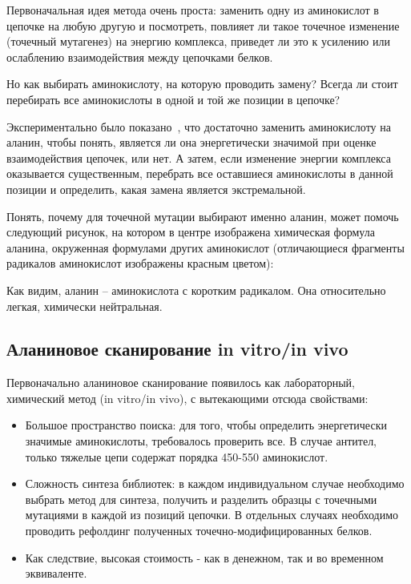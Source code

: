 Первоначальная идея метода очень проста: заменить одну из аминокислот в цепочке на любую другую и посмотреть, повлияет ли такое точечное изменение (точечный мутагенез) на энергию комплекса, приведет ли это к усилению или ослаблению взаимодействия между цепочками белков. 

Но как выбирать аминокислоту, на которую проводить замену? Всегда ли стоит перебирать все аминокислоты в одной и той же позиции в цепочке?

Экспериментально было показано~\cite{alascan2001}, что достаточно заменить аминокислоту на аланин, чтобы понять, является ли она энергетически значимой при оценке взаимодействия цепочек, или нет. А затем, если изменение энергии комплекса \ddG\,  оказывается существенным, перебрать все оставшиеся аминокислоты в данной позиции и определить, какая замена является экстремальной.

Понять, почему для точечной мутации выбирают именно аланин, может помочь следующий рисунок, на котором в центре изображена химическая формула аланина, окруженная формулами других аминокислот (отличающиеся фрагменты радикалов аминокислот изображены красным цветом):

\begin{center}
 \resizebox{0.4\textheight}{!}{
 \ttfamily
 \footnotesize
 \aapicture
 }
\end{center}

Как видим, аланин -- аминокислота с коротким радикалом. Она относительно легкая, химически нейтральная. 

\subsection{Аланиновое сканирование in vitro/in vivo}
Первоначально аланиновое сканирование появилось как лабораторный, химический метод (in vitro/in vivo), с вытекающими отсюда свойствами:
\begin{itemize}
\item Большое пространство поиска: для того, чтобы определить энергетически значимые аминокислоты, требовалось проверить все. В случае антител, только тяжелые цепи содержат порядка 450-550 аминокислот.
\item Сложность синтеза библиотек: в каждом индивидуальном случае необходимо выбрать метод для синтеза, получить и разделить образцы с точечными мутациями в каждой из позиций цепочки. В отдельных случаях необходимо проводить рефолдинг полученных точечно-модифицированных белков.
\item Как следствие, высокая стоимость - как в денежном, так и во временном эквиваленте.
\end{itemize}


